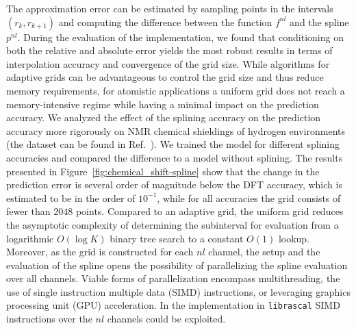 The approximation error can be estimated by sampling points in the intervals $(r_k, r_{k+1})$ and computing the difference between the function $f^{nl}$ and the spline $p^{nl}$.
During the evaluation of the implementation, we found that conditioning on both the relative and absolute error yields the most robust results in terms of interpolation accuracy and convergence of the grid size.
While algorithms for adaptive grids can be advantageous to control the grid size and thus reduce memory requirements, for atomistic applications a uniform grid does not reach a memory-intensive regime while having a minimal impact on the prediction accuracy.
We analyzed the effect of the splining accuracy on the prediction accuracy more rigorously on NMR chemical shieldings of hydrogen environments (the dataset can be found in Ref.~\cite{paru+18ncomm}).
We trained the model for different splining accuracies and compared the difference to a model without splining.
The results presented in Figure~\ref{fig:chemical_shift-spline} show that the change in the prediction error is several order of magnitude below the DFT accuracy, which is estimated to be in the order of $10^{-1}$, while for all accuracies the grid consists of fewer than $2048$ points.
Compared to an adaptive grid, the uniform grid reduces the asymptotic complexity of determining the subinterval for evaluation from a logarithmic $O(\log K)$ binary tree search to a constant $O(1)$ lookup.
Moreover, as the grid is constructed for each $nl$ channel, the setup and the evaluation of the spline opens the possibility of parallelizing the spline evaluation over all channels.
Viable forms of parallelization encompass multithreading, the use of single instruction multiple data (SIMD) instructions, or leveraging graphics processing unit (GPU) acceleration.
In the implementation in \texttt{librascal} SIMD instructions over the $nl$ channels could be exploited.
